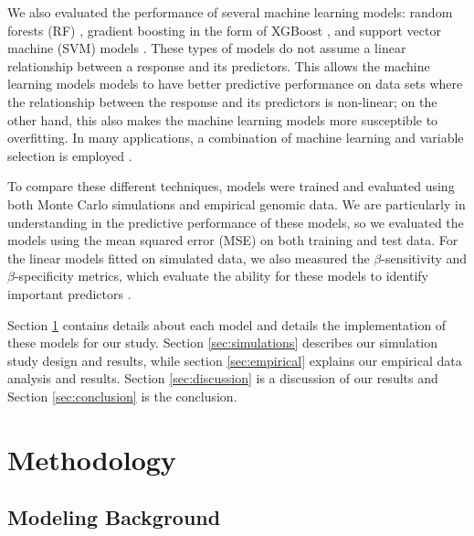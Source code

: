 \documentclass{article}
\begin{document}
	We also evaluated the performance of several machine learning models: random forests (RF) \cite{breiman2001random}, gradient boosting in the form of XGBoost \cite{chen2021xgboost}, and support vector machine (SVM) models \cite{cortes1995support}. These types of models do not assume a linear relationship between a response and its predictors. This allows the machine learning models models to have better predictive performance on data sets where the relationship between the response and its predictors is non-linear; on the other hand, this also makes the machine learning models more susceptible to overfitting. In many applications, a combination of machine learning and variable selection is employed \cite{wang2018enhanced}.
	
	To compare these different techniques, models were trained and evaluated using both Monte Carlo simulations and empirical genomic data. We are particularly in understanding in the predictive performance of these models, so we evaluated the models using the mean squared error (MSE) on both training and test data. For the linear models fitted on simulated data, we also measured the $\beta$-sensitivity and $\beta$-specificity metrics, which evaluate the ability for these models to identify important predictors \cite{liu2020logsum}.
	
	Section \ref{sec:methodology} contains details about each model and details the implementation of these models for our study. Section \ref{sec:simulations} describes our simulation study design and results, while section \ref{sec:empirical} explains our empirical data analysis and results. Section \ref{sec:discussion} is a discussion of our results and Section \ref{sec:conclusion} is the conclusion.
	
	\section{Methodology}\label{sec:methodology}
	\subsection{Modeling Background}
	
\end{document}
